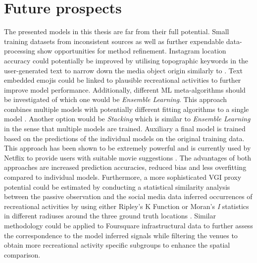\section{Future prospects} \label{future_prospects}
The presented models in this thesis are far from their full potential. Small training datasets from inconsistent sources as well as further expendable data-processing show opportunities for method refinement. Instagram location accuracy could potentially be improved by utilising topographic keywords in the user-generated text to narrow down the media object origin similarly to \textcite{Ostermann2015}. Text embedded emojis could be linked to plausible recreational activities to further improve model performance. Additionally, different ML meta-algorithms should be investigated of which one would be \textit{Ensemble Learning}. This approach combines multiple models with potentially different fitting algorithms to a single model \parencite{Zhou2009}. Another option would be \textit{Stacking} which is similar to \textit{Ensemble Learning} in the sense that multiple models are trained. Auxiliary a final model is trained based on the predictions of the individual models on the original training data. This approach has been shown to be extremely powerful and is currently used by Netflix to provide users with suitable movie suggestions \parencite{AndreasToscher2009}. The advantages of both approaches are increased prediction accuracies, reduced bias and less overfitting compared to individual models. Furthermore, a more sophisticated VGI proxy potential could be estimated by conducting a statistical similarity analysis between the passive observation and the social media data inferred occurrences of recreational activities by using either Ripley's K Function or Moran's \textit{I} statistics in different radiuses around the three ground truth locations \parencite{OSullivan2003}. Similar methodology could be applied to Foursquare infrastructural data to further assess the correspondence to the model inferred signals while filtering the venues to obtain more recreational activity specific subgroups to enhance the spatial comparison. 



